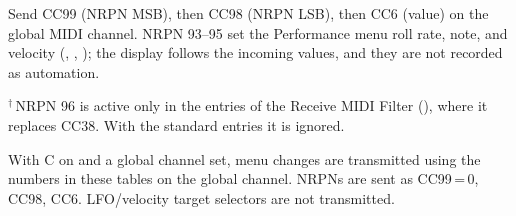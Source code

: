 {\small
\noindent Send CC99 (NRPN MSB), then CC98 (NRPN LSB), then CC6 (value) on the global MIDI
channel. NRPN 93--95 set the Performance menu roll rate, note, and velocity (,
, ); the display follows the incoming values, and they are not recorded
as automation.

\noindent$^{\dagger}$\,NRPN 96 is active only in the \textcent{} entries of the Receive MIDI
Filter (), where it replaces CC38. With the standard entries it is ignored.

\medskip
\noindent With  C on and a global channel set, menu changes are transmitted using the
numbers in these tables on the global channel. NRPNs are sent as CC99\,=\,0, CC98, CC6.
LFO/velocity target selectors are not transmitted.
}
